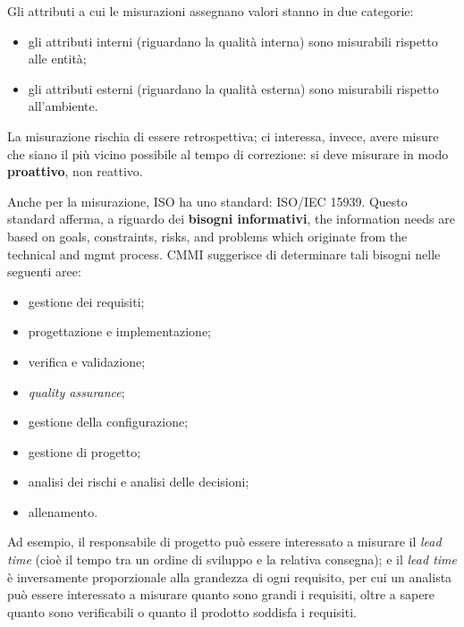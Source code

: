 \documentclass[a4paper]{article}
\begin{document}
		
Gli attributi a cui le misurazioni assegnano valori stanno in due categorie:
		
	\begin{itemize}
		
			
	\item gli attributi interni (riguardano la qualità interna) sono misurabili rispetto alle entità;
			
	\item gli attributi esterni (riguardano la qualità esterna) sono misurabili rispetto all'ambiente.
		
	\end{itemize}

		
La misurazione rischia di essere retrospettiva; ci interessa, invece, avere misure che siano il più vicino possibile al tempo di correzione: si deve misurare in modo \textbf{proattivo}, non reattivo.
		
Anche per la misurazione, ISO ha uno standard: ISO/IEC 15939. Questo standard afferma, a riguardo dei \textbf{bisogni informativi}, the information needs are based on goals, constraints, risks, and problems which originate from the technical and mgmt process. CMMI suggerisce di determinare tali bisogni nelle seguenti aree:
		
	\begin{itemize}
		
			
	\item gestione dei requisiti;
			
	\item progettazione e implementazione;
			
	\item verifica e validazione;
			
	\item \emph{quality assurance};
			
	\item gestione della configurazione;
			
	\item gestione di progetto;
			
	\item analisi dei rischi e analisi delle decisioni;
			
	\item allenamento.
		
	\end{itemize}

		
Ad esempio, il responsabile di progetto può essere interessato a misurare il \emph{lead time} (cioè il tempo tra un ordine di sviluppo e la relativa consegna); e il \emph{lead time} è inversamente proporzionale alla grandezza di ogni requisito, per cui un analista può essere interessato a misurare quanto sono grandi i requisiti, oltre a sapere quanto sono verificabili o quanto il prodotto soddisfa i requisiti.
		
\end{document}
